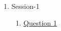 \clearpage
\renewcommand{\notetitle}{Table of Contents}
\label{toc}
\begin{enumerate}

\item Session-1
\begin{enumerate}
\item \hyperref[202501120904]{Question 1}
\end{enumerate}
\end{enumerate}

\newpage
